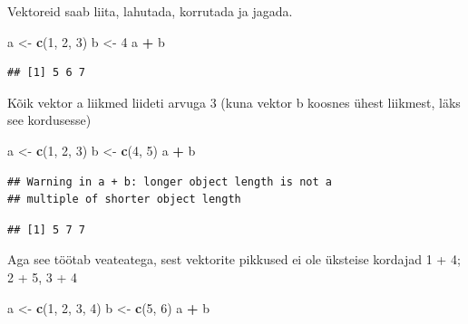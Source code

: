\documentclass[]{book}
\newenvironment{Shaded}{\begin{snugshade}}{\end{snugshade}}
\newcommand{\KeywordTok}[1]{\textcolor[rgb]{0.13,0.29,0.53}{\textbf{#1}}}
\newcommand{\DecValTok}[1]{\textcolor[rgb]{0.00,0.00,0.81}{#1}}
\newcommand{\StringTok}[1]{\textcolor[rgb]{0.31,0.60,0.02}{#1}}
\newcommand{\OperatorTok}[1]{\textcolor[rgb]{0.81,0.36,0.00}{\textbf{#1}}}
\newcommand{\NormalTok}[1]{#1}
\begin{document}
Vektoreid saab liita, lahutada, korrutada ja jagada.

\begin{Shaded}
\begin{Highlighting}[]
\NormalTok{a <-}\StringTok{ }\KeywordTok{c}\NormalTok{(}\DecValTok{1}\NormalTok{, }\DecValTok{2}\NormalTok{, }\DecValTok{3}\NormalTok{)}
\NormalTok{b <-}\StringTok{ }\DecValTok{4}
\NormalTok{a }\OperatorTok{+}\StringTok{ }\NormalTok{b}
\end{Highlighting}
\end{Shaded}

\begin{verbatim}
## [1] 5 6 7
\end{verbatim}

Kõik vektor a liikmed liideti arvuga 3 (kuna vektor b koosnes ühest
liikmest, läks see kordusesse)

\begin{Shaded}
\begin{Highlighting}[]
\NormalTok{a <-}\StringTok{ }\KeywordTok{c}\NormalTok{(}\DecValTok{1}\NormalTok{, }\DecValTok{2}\NormalTok{, }\DecValTok{3}\NormalTok{)}
\NormalTok{b <-}\StringTok{ }\KeywordTok{c}\NormalTok{(}\DecValTok{4}\NormalTok{, }\DecValTok{5}\NormalTok{) }
\NormalTok{a }\OperatorTok{+}\StringTok{ }\NormalTok{b}
\end{Highlighting}
\end{Shaded}

\begin{verbatim}
## Warning in a + b: longer object length is not a
## multiple of shorter object length
\end{verbatim}

\begin{verbatim}
## [1] 5 7 7
\end{verbatim}

Aga see töötab veateatega, sest vektorite pikkused ei ole üksteise
kordajad 1 + 4; 2 + 5, 3 + 4

\begin{Shaded}
\begin{Highlighting}[]
\NormalTok{a <-}\StringTok{ }\KeywordTok{c}\NormalTok{(}\DecValTok{1}\NormalTok{, }\DecValTok{2}\NormalTok{, }\DecValTok{3}\NormalTok{, }\DecValTok{4}\NormalTok{)}
\NormalTok{b <-}\StringTok{ }\KeywordTok{c}\NormalTok{(}\DecValTok{5}\NormalTok{, }\DecValTok{6}\NormalTok{) }
\NormalTok{a }\OperatorTok{+}\StringTok{ }\NormalTok{b}
\end{Highlighting}
\end{Shaded}
\end{document}
